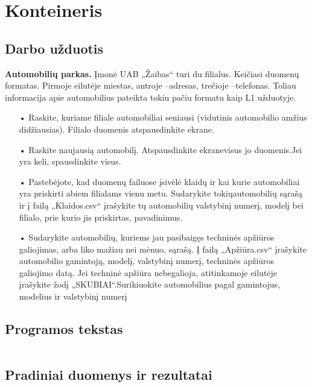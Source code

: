 \documentclass{article}
\begin{document}
\newpage


\section{Konteineris}
\subsection{Darbo užduotis}
\textbf{Automobilių parkas.} Įmonė UAB „Žaibas“ turi du filialus. Keičiasi duomenų formatas. Pirmoje eilutėje miestas, antroje –adresas, trečioje –telefonas.  Toliau  informacija  apie  automobilius  pateikta  tokiu pačiu formatu kaip L1 užduotyje.

\begin{itemize}
    \item[•]Raskite, kuriame filiale automobiliai seniausi (vidutinis automobilio amžius didžiausias). Filialo duomenis atspausdinkite ekrane.
    \item[•]Raskite naujausią automobilį. Atspausdinkite  ekranevisus  jo  duomenis.Jei  yra  keli,  spausdinkite visus.
    \item[•]Pastebėjote, kad duomenų failuose įsivėlė klaidų ir kai kurie automobiliai yra priskirti abiem filialams vienu metu. Sudarykite tokiųautomobilių sąrašą ir į failą „Klaidos.csv“ įrašykite tų automobilių valstybinį numerį, modelį bei filialo, prie kurio jis priskirtas, pavadinimus.
    \item[•]Sudarykite automobilių, kuriems jau pasibaigęs techninės apžiūros galiojimas, arba liko mažiau nei mėnuo, sąrašą. Į failą „Apžiūra.csv“ įrašykite automobilio gamintoją, modelį, valstybinį numerį, techninės apžiūros galiojimo datą. Jei techninė apžiūra nebegalioja, atitinkamoje eilutėje įrašykite žodį „SKUBIAI“.Surikiuokite automobilius pagal gamintojus, modelius ir valstybinį numerį
\end{itemize}

\subsection{Programos tekstas}

\inputminted{csharp}{Assets/L3/L3-rawtext.txt}

\subsection{Pradiniai duomenys ir rezultatai}
\end{document}
